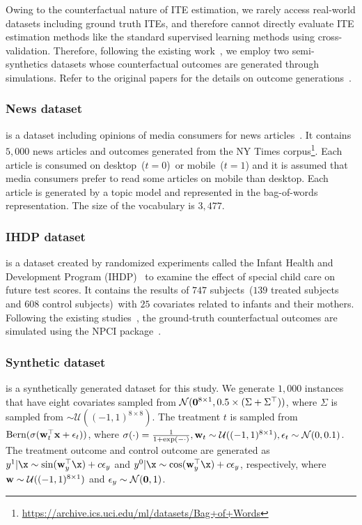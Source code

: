 Owing to the counterfactual nature of ITE estimation, we rarely access real-world datasets including ground truth ITEs, and therefore cannot directly evaluate ITE estimation methods like the standard supervised learning methods using cross-validation.
Therefore, following the existing work~\cite{johansson2016learning}, we employ two semi-synthetics datasets whose counterfactual outcomes are generated through simulations. 
Refer to the original papers for the details on outcome generations~\cite{hill2011bayesian,johansson2016learning}.


\subsubsection{News dataset} is a dataset including opinions of media consumers for news articles~\cite{johansson2016learning}. 
It contains $5{,}000$ news articles and outcomes generated from the NY Times corpus\footnote{\url{https://archive.ics.uci.edu/ml/datasets/Bag+of+Words}}.
Each article is consumed on desktop~($t=0$)~or mobile~($t=1$) and it is assumed that media consumers prefer to read some articles on mobile than desktop. 
Each article is generated by a topic model and represented in the bag-of-words representation. The size of the vocabulary is $3{,}477$. 


\subsubsection{IHDP dataset} is a dataset created by randomized experiments called the Infant Health and Development Program (IHDP)~\cite{hill2011bayesian} to examine the effect of special child care on future test scores. 
It contains the results of $747$ subjects~($139$ treated subjects and $608$ control subjects)~with $25$ covariates related to infants and their mothers.
Following the existing studies~\cite{johansson2016learning,shalit2017estimating}, the ground-truth counterfactual outcomes are simulated using the NPCI package~\cite{dorie2016npci}. 


\subsubsection{Synthetic dataset} is a synthetically generated dataset for this study. 
We generate $1{,}000$ instances that have eight covariates sampled from $\mathcal{N}({\bf 0}^{8\times1},0.5\times(\Sigma+\Sigma^{\top} ))$,
where $\Sigma $ is sampled from $\sim\mathcal{U}((-1,1)^{8\times8})$.
The treatment $t$ is sampled from $\text{Bern}(\sigma({\bf w}_t^{\top}{\bf x}+\epsilon_t))$, where $\sigma(\cdot)=\frac{1}{1+\exp(-\cdot)}, {\bf w}_t\sim\mathcal{U}((-1,1)^{8\times1}), \epsilon_t\sim\mathcal{N}(0, 0.1)$. 
The treatment outcome and control outcome are generated as  $y^{1}|\x\sim \sin({\bf w}^{\top}_y \x) +c\epsilon_{y}$ and $y^{0}|\x\sim \cos({\bf w}^{\top}_y \x) +c\epsilon_{y}$,
respectively, where ${\bf w} \sim\mathcal{U}((-1,1)^{8\times1})$ and $ \epsilon_y\sim\mathcal{N}({\bf 0}, 1)$. 


